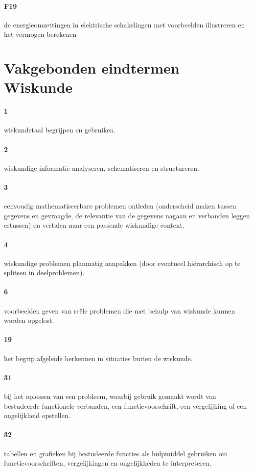 \documentclass{article}
\begin{document}
		\paragraph*{F19}		de energieomzettingen in elektrische schakelingen met voorbeelden illustreren en het vermogen berekenen
	\section{Vakgebonden eindtermen Wiskunde}
	\paragraph*{1} wiskundetaal begrijpen en gebruiken.
	\paragraph*{2} wiskundige informatie analyseren, schematiseren en structureren.
	\paragraph*{3} eenvoudig mathematiseerbare problemen ontleden (onderscheid maken tussen gegevens en gevraagde, de relevantie van de gegevens nagaan en verbanden leggen ertussen) en vertalen naar een passende wiskundige context.
	\paragraph*{4}	wiskundige problemen planmatig aanpakken (door eventueel hiërarchisch op te splitsen in deelproblemen).
	\paragraph*{6}		voorbeelden geven van reële problemen die met behulp van wiskunde kunnen worden opgelost.
	\paragraph*{19}		het begrip afgeleide herkennen in situaties buiten de wiskunde.
	\paragraph*{31}		bij het oplossen van een probleem, waarbij gebruik gemaakt wordt van bestudeerde functionele verbanden, een functievoorschrift, een vergelijking of een ongelijkheid opstellen.
	\paragraph*{32}		tabellen en grafieken bij bestudeerde functies als hulpmiddel gebruiken om functievoorschriften, vergelijkingen en ongelijkheden te interpreteren.
\end{document}
